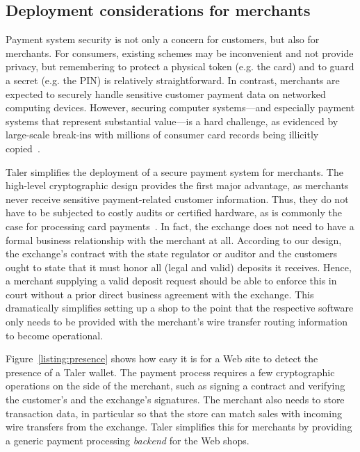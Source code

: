 \documentclass{llncs}
\begin{document}
\subsection{Deployment considerations for merchants}

Payment system security is not only a concern for
customers, but also for merchants.  For consumers, existing schemes
may be inconvenient and not provide privacy, but remembering to
protect a physical token (e.g. the card) and to guard a secret
(e.g. the PIN) is relatively straightforward.  In contrast, merchants
are expected to securely handle sensitive customer payment data on
networked computing devices.  However, securing computer systems---and
especially payment systems that represent substantial value---is a
hard challenge, as evidenced by large-scale break-ins with millions of
consumer card records being illicitly copied~\cite{target}.

Taler simplifies the deployment of a secure payment system for
merchants. The high-level cryptographic design provides the first
major advantage, as merchants never receive sensitive payment-related
customer information.  Thus, they do not have to be subjected to
costly audits or certified hardware, as is commonly the case for
processing card payments~\cite{pcidss}. In fact, the exchange does not
need to have a formal business relationship with the merchant at all.
According to our design, the exchange's contract with the state
regulator or auditor and the customers ought to state that it must
honor all (legal and valid) deposits it receives.  Hence, a merchant
supplying a valid deposit request should be able to enforce this in
court without a prior direct business agreement with the exchange.
This dramatically simplifies setting up a shop to the point that the
respective software only needs to be provided with the merchant's wire
transfer routing information to become operational.

Figure~\ref{listing:presence} shows how easy it is for a Web site to
detect the presence of a Taler wallet.  The payment process requires a
few cryptographic operations on the side of the merchant, such as
signing a contract and verifying the customer's and the exchange's
signatures.  The merchant also needs to store transaction data, in
particular so that the store can match sales with incoming wire
transfers from the exchange.  Taler simplifies this for merchants by
providing a generic payment processing {\em backend} for the Web
shops.
\end{document}
